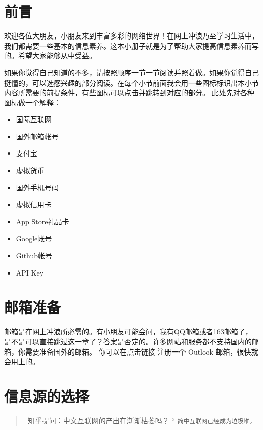 \tableofcontents
\newpage

\section*{前言}
欢迎各位大朋友，小朋友来到丰富多彩的网络世界！在网上冲浪乃至学习生活中，我们都需要一些基本的信息素养。这本小册子就是为了帮助大家提高信息素养而写的。希望大家能够从中受益。

如果你觉得自己知道的不多，请按照顺序一节一节阅读并照着做。如果你觉得自己挺懂的，可以选感兴趣的部分阅读。在每个小节前面我会用一些图标标识出本小节内容所需要的前提条件，有些图标可以点击并跳转到对应的部分。
此处先对各种图标做一个解释：
\begin{itemize}
    \item \hyperlink{warp}{}\quad 国际互联网
    \item \hyperlink{mail}{}\quad 国外邮箱帐号
    \item {}\quad 支付宝
    \item {}\quad 虚拟货币
    \item \hyperlink{sms-code}{}\quad 国外手机号码
    \item \hyperlink{card}{}\quad 虚拟信用卡
    \item \hyperlink{gift-card}{}\quad \textsf{App Store}礼品卡
    \item \hyperlink{google}{}\quad \textsf{Google}帐号
    \item \hyperlink{github}{}\quad \textsf{Github}帐号
    \item \hyperlink{api}{}\quad API Key
\end{itemize}

\hypertarget{mail}{\section*{邮箱准备}}
邮箱是在网上冲浪所必需的。有小朋友可能会问，我有\textsf{QQ}邮箱或者\textsf{163}邮箱了，是不是可以直接跳过这一章了？答案是否定的。许多网站和服务都不支持国内的邮箱，你需要准备国外的邮箱。
你可以在点击链接 \href{https://signup.live.com/signup}{\color{black}\faLink} 注册一个 \textsf{Outlook} 邮箱，很快就会用上的。

\section{信息源的选择}
\vspace{3cm}
\begin{quote}{\small \ 知乎提问：中文互联网的产出在渐渐枯萎吗？\normalsize}
    \Huge{“}
    \normalsize \texttt{简中互联网已经成为垃圾堆。}
    \end{quote}
    
